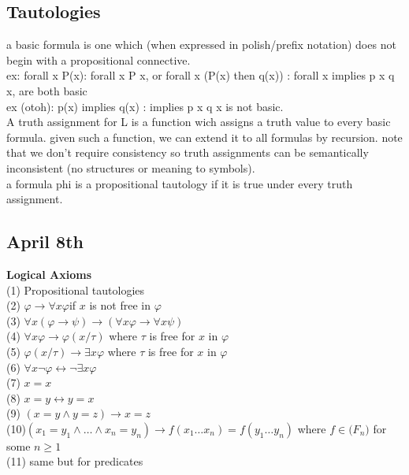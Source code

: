 \documentclass[11pt]{amsart}
\begin{document}
    \subsection{Tautologies}
    a basic formula is one which (when expressed in polish/prefix notation) does not begin with a propositional connective. \\
    ex: forall x P(x): forall x P x, or forall x (P(x) then q(x)) : forall x implies p x q x, are both basic\\
    ex (otoh): p(x) implies q(x) : implies p x q x is not basic.
    \\ A truth assignment for L is a function wich assigns a truth value to every basic formula.
    given such a function, we can extend it to all formulas by recursion.
    note that we don't require consistency so truth assignments can be semantically inconsistent (no structures or meaning to symbols).
    \\ a formula phi is a propositional tautology if it is true under every truth assignment.

    \subsection{April 8th}

    \textbf{Logical Axioms}
    \\ (1) Propositional tautologies
    \\ (2) $\varphi \rightarrow \forall x \varphi$if $x$ is not free in $\varphi$
    \\ (3) $\forall x (\varphi \rightarrow \psi) \rightarrow (\forall x \varphi \rightarrow \forall x \psi)$
    \\ (4) $\forall x \varphi \rightarrow \varphi(x / \tau)$ where $\tau$ is free for $x$ in $\varphi$
    \\ (5) $\varphi(x / \tau) \rightarrow \exists x \varphi$ where $\tau$ is free for $x$ in $\varphi$
    \\ (6) $\forall x \neg \varphi \leftrightarrow \neg \exists x \varphi$
    \\ (7) $x=x$
    \\ (8) $x=y \leftrightarrow y=x$
    \\ (9) $(x=y \wedge y = z) \rightarrow x=z$
    \\ (10)$ (x_1=y_1 \wedge \dots \wedge x_n =y_n) \rightarrow f(x_1 \dots x_n) = f(y_1 \dots y_n)$ where $f \in \mathscr(F_n)$ for some $n \geq 1$
    \\ (11) same but for predicates
\end{document}
